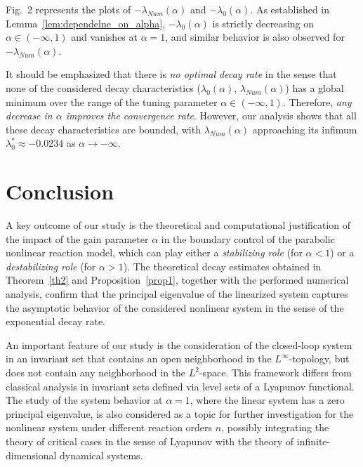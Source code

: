 \documentclass{mpi2015-cscpreprint}
\numberwithin{equation}{section}
\begin{document}
Fig.~2 represents the plots of $-\lambda_{Num}(\alpha)$ and $-\lambda_0(\alpha)$. 
As established in Lemma~\ref{lem:dependelne_on_alpha}, $-\lambda_0(\alpha)$ is strictly decreasing on $\alpha\in (-\infty,1)$
and vanishes at $\alpha=1$, and similar behavior is also observed for $-\lambda_{Num}(\alpha)$. 

It should be emphasized that there is {\em no optimal decay rate} in the sense that none of the considered decay characteristics ($\lambda_0(\alpha)$, $\lambda_{Num}(\alpha)$) has a global minimum over the range of the tuning parameter $\alpha\in (-\infty,1)$. Therefore, {\em any decrease in $\alpha$ improves the convergence rate}. However, our analysis shows that all these decay characteristics are bounded, with $\lambda_{Num}(\alpha)$ approaching its infimum $\lambda_0^*\approx -0.0234$ as $\alpha\to-\infty$.

\section*{Conclusion}\label{sec:con}

A key outcome of our study is the theoretical and computational justification of the impact of the gain parameter $\alpha$ in the boundary control of the parabolic nonlinear reaction model, which can play either a {\em stabilizing role} (for $\alpha<1$) or a {\em destabilizing role} (for $\alpha>1$).
%
The theoretical decay estimates obtained in Theorem~\ref{th2} and Proposition~\ref{prop1}, together  with the performed numerical analysis, confirm that the principal eigenvalue of the linearized system captures the asymptotic behavior of the considered nonlinear system in the sense of the exponential decay rate.
%

An important feature of our study is the consideration of the closed-loop system in an invariant set that contains an open neighborhood in the $L^\infty$-topology, but does not contain any neighborhood in the $L^2$-space. This framework differs from classical analysis in invariant sets defined via level sets of a Lyapunov functional. 
%
The study of the system behavior at $\alpha=1$, where the linear system has a zero principal eigenvalue, is also considered as a topic for further investigation for the nonlinear system under different reaction orders $n$, possibly integrating the theory of critical cases in the sense of Lyapunov with the theory of infinite-dimensional dynamical systems.
\end{document}
